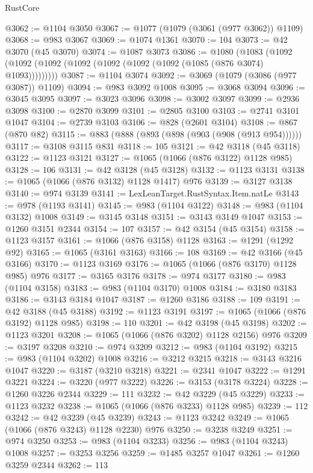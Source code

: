 \begin{lexlean}{RustCore}
\begin{coremodule}
@3062 := @1104 @3050
@3067 := @1077 (@1079 (@3061 (@977 @3062)) @1109)
@3068 := @983 @3067
@3069 := @1074 @1361
@3070 := 104
@3073 := @42 @3070 (@45 @3070)
@3074 := @1087 @3073
@3086 := @1080
    (@1083 (@1092 (@1092 (@1092 (@1092 (@1092 (@1092 (@1092 (@1085 (@876 @3074) @1093)))))))))
@3087 := @1104 @3074
@3092 := @3069 (@1079 (@3086 (@977 @3087)) @1109)
@3094 := @983 @3092 @1008
@3095 := @3068 @3094
@3096 := @3045 @3095
@3097 := @3023 @3096
@3098 := @3002 @3097
@3099 := @2936 @3098
@3100 := @2870 @3099
@3101 := @2805 @3100
@3103 := @2741 @3101 @1047
@3104 := @2739 @3103
@3106 := @828 (@2601 @3104)
@3108 := @867 (@870 @82)
@3115 := @883 (@888 (@893 (@898 (@903 (@908 (@913 @954))))))
@3117 := @3108 @3115 @831
@3118 := 105
@3121 := @42 @3118 (@45 @3118)
@3122 := @1123 @3121
@3127 := @1065 (@1066 (@876 @3122) @1128 @985)
@3128 := 106
@3131 := @42 @3128 (@45 @3128)
@3132 := @1123 @3131
@3138 := @1065 (@1066 (@876 @3132) @1128 @1417) @976
@3139 := @3127 @3138
@3140 := @974 @3139
@3141 := LexLeanTarget.RustSyntax.Item.natLe
@3143 := @978 (@1193 @3141)
@3145 := @983 (@1104 @3122)
@3148 := @983 (@1104 @3132) @1008
@3149 := @3145 @3148
@3151 := @3143 @3149 @1047
@3153 := @1260 @3151 @2344
@3154 := 107
@3157 := @42 @3154 (@45 @3154)
@3158 := @1123 @3157
@3161 := @1066 (@876 @3158) @1128
@3163 := @1291 (@1292 @92)
@3165 := @1065 (@3161 @3163)
@3166 := 108
@3169 := @42 @3166 (@45 @3166)
@3170 := @1123 @3169
@3176 := @1065 (@1066 (@876 @3170) @1128 @985) @976
@3177 := @3165 @3176
@3178 := @974 @3177
@3180 := @983 (@1104 @3158)
@3183 := @983 (@1104 @3170) @1008
@3184 := @3180 @3183
@3186 := @3143 @3184 @1047
@3187 := @1260 @3186
@3188 := 109
@3191 := @42 @3188 (@45 @3188)
@3192 := @1123 @3191
@3197 := @1065 (@1066 (@876 @3192) @1128 @985)
@3198 := 110
@3201 := @42 @3198 (@45 @3198)
@3202 := @1123 @3201
@3208 := @1065 (@1066 (@876 @3202) @1128 @2156) @976
@3209 := @3197 @3208
@3210 := @974 @3209
@3212 := @983 (@1104 @3192)
@3215 := @983 (@1104 @3202) @1008
@3216 := @3212 @3215
@3218 := @3143 @3216 @1047
@3220 := @3187 (@3210 @3218)
@3221 := @2341 @1047
@3222 := @1291 @3221
@3224 := @3220 (@977 @3222)
@3226 := @3153 (@3178 @3224)
@3228 := @1260 @3226 @2344
@3229 := 111
@3232 := @42 @3229 (@45 @3229)
@3233 := @1123 @3232
@3238 := @1065 (@1066 (@876 @3233) @1128 @985)
@3239 := 112
@3242 := @42 @3239 (@45 @3239)
@3243 := @1123 @3242
@3249 := @1065 (@1066 (@876 @3243) @1128 @2230) @976
@3250 := @3238 @3249
@3251 := @974 @3250
@3253 := @983 (@1104 @3233)
@3256 := @983 (@1104 @3243) @1008
@3257 := @3253 @3256
@3259 := @1485 @3257 @1047
@3261 := @1260 @3259 @2344
@3262 := 113

\end{coremodule}
\end{lexlean}
